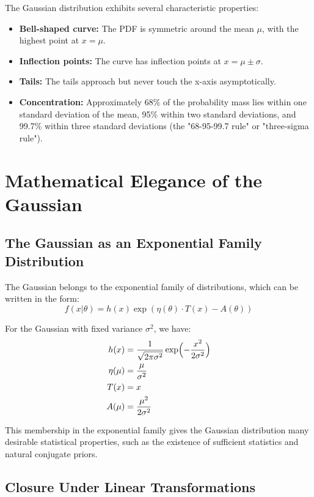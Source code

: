 \documentclass{article}
\begin{document}
The Gaussian distribution exhibits several characteristic properties:

\begin{itemize}
\item \textbf{Bell-shaped curve:} The PDF is symmetric around the mean $\mu$, with the highest point at $x = \mu$.
\item \textbf{Inflection points:} The curve has inflection points at $x = \mu \pm \sigma$.
\item \textbf{Tails:} The tails approach but never touch the x-axis asymptotically.
\item \textbf{Concentration:} Approximately 68\% of the probability mass lies within one standard deviation of the mean, 95\% within two standard deviations, and 99.7\% within three standard deviations (the "68-95-99.7 rule" or "three-sigma rule").
\end{itemize}

\section{Mathematical Elegance of the Gaussian}

\subsection{The Gaussian as an Exponential Family Distribution}

The Gaussian belongs to the exponential family of distributions, which can be written in the form:
\[
f(x|\theta) = h(x)\exp(\eta(\theta) \cdot T(x) - A(\theta))
\]

For the Gaussian with fixed variance $\sigma^2$, we have:
\begin{align*}
h(x) &= \frac{1}{\sqrt{2\pi\sigma^2}}\exp\Bigl(-\frac{x^2}{2\sigma^2}\Bigr) \\
\eta(\mu) &= \frac{\mu}{\sigma^2} \\
T(x) &= x \\
A(\mu) &= \frac{\mu^2}{2\sigma^2}
\end{align*}

This membership in the exponential family gives the Gaussian distribution many desirable statistical properties, such as the existence of sufficient statistics and natural conjugate priors.

\subsection{Closure Under Linear Transformations}
\end{document}
